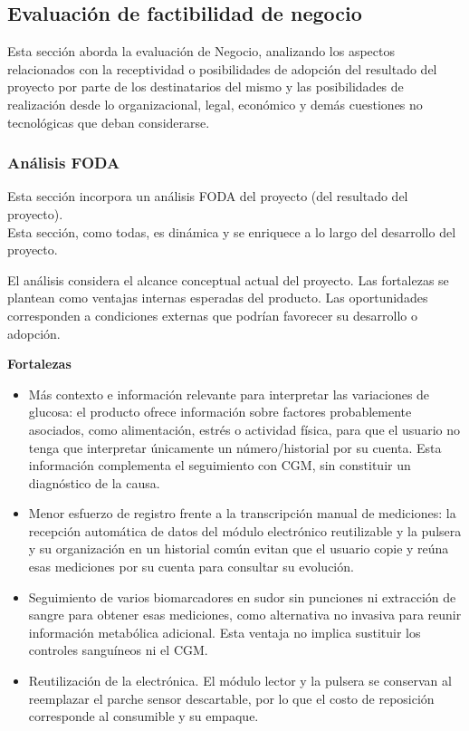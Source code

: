\subsection{Evaluación de factibilidad de negocio}
{\consigna
Esta sección aborda la evaluación de Negocio, analizando los aspectos relacionados con la receptividad o posibilidades de adopción del resultado del proyecto por parte de los destinatarios del mismo y las posibilidades de realización desde lo organizacional, legal, económico y demás cuestiones no tecnológicas que deban considerarse.
}




\subsubsection{Análisis FODA}
{\consigna
Esta sección incorpora un análisis FODA del proyecto (del resultado del proyecto).\\
Esta sección, como todas, es dinámica y se enriquece a lo largo del desarrollo del proyecto.
}

El análisis considera el alcance conceptual actual del proyecto. Las fortalezas se plantean como ventajas internas esperadas del producto. Las oportunidades corresponden a condiciones externas que podrían favorecer su desarrollo o adopción.

\noindent\textbf{Fortalezas}
\begin{itemize}
    \item Más contexto e información relevante para interpretar las variaciones de glucosa: el producto ofrece información sobre factores probablemente asociados, como alimentación, estrés o actividad física, para que el usuario no tenga que interpretar únicamente un número/historial por su cuenta. Esta información complementa el seguimiento con CGM, sin constituir un diagnóstico de la causa.
    \item Menor esfuerzo de registro frente a la transcripción manual de mediciones: la recepción automática de datos del módulo electrónico reutilizable y la pulsera y su organización en un historial común evitan que el usuario copie y reúna esas mediciones por su cuenta para consultar su evolución.
    \item Seguimiento de varios biomarcadores en sudor sin punciones ni extracción de sangre para obtener esas mediciones, como alternativa no invasiva para reunir información metabólica adicional. Esta ventaja no implica sustituir los controles sanguíneos ni el CGM.
    \item Reutilización de la electrónica. El módulo lector y la pulsera se conservan al reemplazar el parche sensor descartable, por lo que el costo de reposición corresponde al consumible y su empaque. 
\end{itemize}

